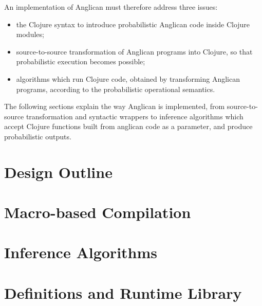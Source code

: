 \documentclass[a4paper]{article}
\begin{document}
An implementation of Anglican must therefore address three issues:
\begin{itemize}
	\item the Clojure syntax to introduce probabilistic Anglican
		code inside Clojure modules;
	\item source-to-source transformation of Anglican programs
		into Clojure, so that probabilistic execution becomes
		possible;
	\item algorithms which run Clojure code, obtained by
		transforming Anglican programs, according to the
		probabilistic operational semantics.
\end{itemize}
The following sections explain the way Anglican is implemented,
from source-to-source transformation and syntactic wrappers to
inference algorithms which accept Clojure functions built from
anglican code as a parameter, and produce probabilistic outputs.

\section{Design Outline}

\section{Macro-based Compilation}

\section{Inference Algorithms}

\section{Definitions and Runtime Library}




\end{document}
